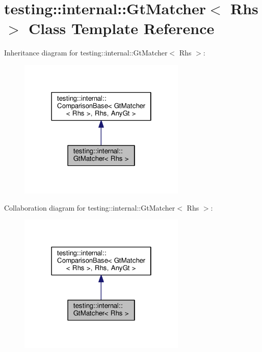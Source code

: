 \hypertarget{classtesting_1_1internal_1_1GtMatcher}{}\section{testing\+:\+:internal\+:\+:Gt\+Matcher$<$ Rhs $>$ Class Template Reference}
\label{classtesting_1_1internal_1_1GtMatcher}


Inheritance diagram for testing\+:\+:internal\+:\+:Gt\+Matcher$<$ Rhs $>$\+:\nopagebreak
\begin{figure}[H]
\begin{center}
\leavevmode
\includegraphics[width=226pt]{classtesting_1_1internal_1_1GtMatcher__inherit__graph}
\end{center}
\end{figure}


Collaboration diagram for testing\+:\+:internal\+:\+:Gt\+Matcher$<$ Rhs $>$\+:\nopagebreak
\begin{figure}[H]
\begin{center}
\leavevmode
\includegraphics[width=226pt]{classtesting_1_1internal_1_1GtMatcher__coll__graph}
\end{center}
\end{figure}
